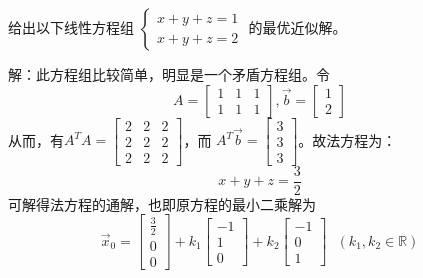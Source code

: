 \begin{eg}
 给出以下线性方程组
$\begin{cases}
x+y+z=1\\x+y+z=2
\end{cases}$
的最优近似解。
\end{eg}
解：此方程组比较简单，明显是一个矛盾方程组。令
\begin{equation*}
A=\begin{bmatrix}1&1&1\\1&1&1\end{bmatrix},
\vec{b}=\begin{bmatrix}1\\2\end{bmatrix}
\end{equation*}
从而，有$A^TA=\begin{bmatrix}2&2&2\\2&2&2\\2&2&2\end{bmatrix}$，而
$A^T\vec{b}=\begin{bmatrix}3\\3\\3\end{bmatrix}$。故法方程为：
$$x+y+z=\frac{3}{2}$$
可解得法方程的通解，也即原方程的最小二乘解为
\begin{equation*}
\vec{x}_0=\begin{bmatrix}\frac{3}{2}\\0\\0\end{bmatrix}+
k_1\begin{bmatrix}-1\\1\\0\end{bmatrix}+k_2\begin{bmatrix}-1\\0\\1\end{bmatrix}
~~~(k_1,k_2\in\mathbb{R})
\end{equation*}

